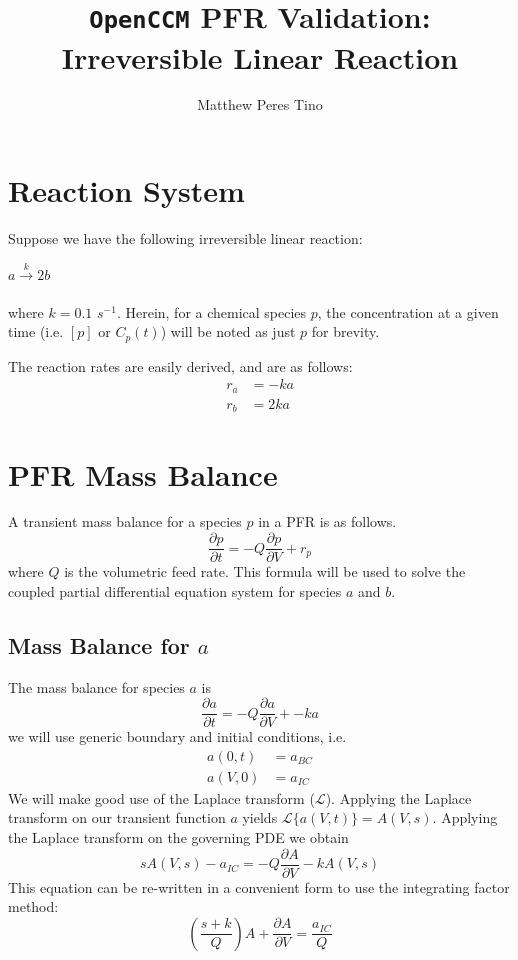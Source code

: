 \documentclass[a4paper,12pt]{article}
\begin{document}
\title{\texttt{OpenCCM} PFR Validation: Irreversible Linear Reaction}
\author{Matthew Peres Tino}
\maketitle

\section{Reaction System}

Suppose we have the following irreversible linear reaction:
\begin{center}
	$a\xrightarrow[]{k} 2b$
\end{center}
where $k = 0.1$ $s^{-1}$.
Herein, for a chemical species $p$, the concentration at a given time (i.e. $[p]$ or $C_p(t)$) will be noted as just $p$ for brevity.

The reaction rates are easily derived, and are as follows:
\begin{align}
    r_a &= -k a \\
    r_b &= 2 k a
\end{align}

\section{PFR Mass Balance}

A transient mass balance for a species $p$ in a PFR is as follows. 
\begin{equation}
	\frac{\partial p}{\partial t} = -Q\frac{\partial p}{\partial V} + r_p
\end{equation}
where $Q$ is the volumetric feed rate.
This formula will be used to solve the coupled partial differential equation system for species $a$ and $b$. 

\newpage 
\subsection{Mass Balance for $a$}

The mass balance for species $a$ is 
\begin{equation}
	\frac{\partial a}{\partial t} = -Q\frac{\partial a}{\partial V} + -ka
\end{equation}
we will use generic boundary and initial conditions, i.e.
\begin{align}
	a(0, t) &= a_{BC}\\
	a(V, 0) &= a_{IC} 
\end{align}
We will make good use of the Laplace transform ($\mathscr{L}$).
Applying the Laplace transform on our transient function $a$ yields $ \mathscr{L}\{a(V, t)\} = A(V, s) $.
Applying the Laplace transform on the governing PDE we obtain 
\begin{equation}
	sA(V,s) - a_{IC} = -Q\frac{\partial A}{\partial V} - kA(V,s)
\end{equation}
This equation can be re-written in a convenient form to use the integrating factor method:
\begin{equation}
	\left( \frac{s+k}{Q} \right) A + \frac{\partial A}{\partial V} = \frac{a_{IC}}{Q}
\end{equation}
\end{document}
